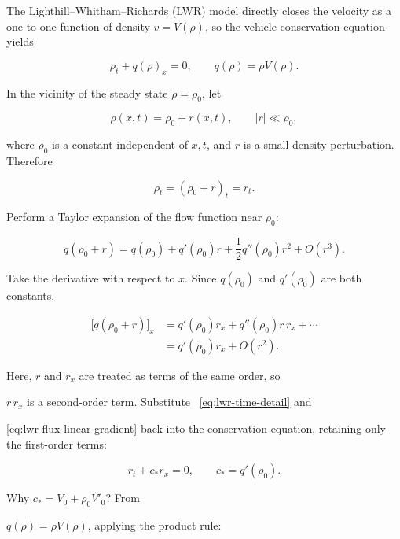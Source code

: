 \documentclass[11pt,a4paper,openany]{book}
\numberwithin{equation}{chapter}
\numberwithin{figure}{chapter}
\numberwithin{table}{chapter}
\begin{document}
The Lighthill–Whitham–Richards (LWR) model directly closes the velocity as a one-to-one function of density $v=V(\rho)$, so the vehicle conservation equation yields \cite{lighthill1955,richards1956}

\begin{equation}
\rho_t+q(\rho)_x=0,
\qquad q(\rho)=\rho V(\rho).
\label{eq:lwr}
\end{equation}

In the vicinity of the steady state $\rho=\rho_0$, let

\begin{equation}
\rho(x,t)=\rho_0+r(x,t),
\qquad |r|\ll\rho_0,
\label{eq:lwr-perturbation-detail}
\end{equation}

where $\rho_0$ is a constant independent of $x,t$, and $r$ is a small density perturbation. Therefore

\begin{equation}
\rho_t=(\rho_0+r)_t=r_t.
\label{eq:lwr-time-detail}
\end{equation}

Perform a Taylor expansion of the flow function near $\rho_0$:

\begin{equation}
q(\rho_0+r)
=q(\rho_0)+q'(\rho_0)r
+\frac12q''(\rho_0)r^2+O(r^3).
\label{eq:lwr-flux-taylor}
\end{equation}

Take the derivative with respect to $x$. Since $q(\rho_0)$ and $q'(\rho_0)$ are both constants,

\begin{align}
\bigl[q(\rho_0+r)\bigr]_x
&=q'(\rho_0)r_x
+q''(\rho_0)r\,r_x+\cdots\\
&=q'(\rho_0)r_x+O(r^2).
\label{eq:lwr-flux-linear-gradient}
\end{align}

Here, $r$ and $r_x$ are treated as terms of the same order, so

$r\,r_x$ is a second-order term. Substitute ~\eqref{eq:lwr-time-detail} and

\eqref{eq:lwr-flux-linear-gradient} back into the conservation equation, retaining only the first-order terms:

\begin{equation}
r_t+c_*r_x=0,
\qquad c_*=q'(\rho_0).
\label{eq:lwr-linear}
\end{equation}

Why $c_*=V_0+\rho_0V'_0$? From

$q(\rho)=\rho V(\rho)$, applying the product rule:
\end{document}
